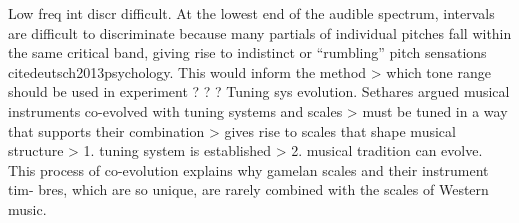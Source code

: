 Low freq int discr difficult. At the lowest end of the audible spectrum, intervals are difficult to discriminate because many partials of individual pitches fall within the same critical band, giving rise to indistinct or “rumbling” pitch sensations cite{deutsch2013psychology}. This would inform the method > which tone range should be used in experiment ? ? ?
Tuning sys evolution. Sethares \cite{sethares2005tuning} argued musical instruments co-evolved with tuning systems and scales > must be tuned in a way that supports their combination > gives rise to scales that shape musical structure > 1. tuning system is established > 2. musical tradition can evolve. This process of co-evolution explains why gamelan scales and their instrument tim- bres, which are so unique, are rarely combined with the scales of Western music.

